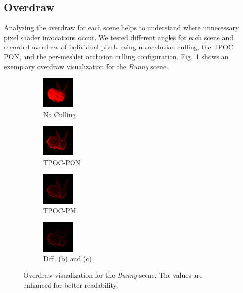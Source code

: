 \documentclass[conference]{IEEEtran}
\begin{document}
\subsection{Overdraw} \label{subsec-overdraw}

\noindent
Analyzing the overdraw for each scene helps to understand where unnecessary pixel shader 
invocations occur. We tested different angles for each scene and recorded overdraw of individual 
pixels using no occlusion culling, the \ac{TPOC-PON}, and the per-meshlet occlusion 
culling configuration. Fig.~\ref{fig:overdraw} shows an exemplary overdraw visualization for the 
\emph{Bunny} scene. \\

\begin{figure}
    \begin{subfigure}{60px}
        \includegraphics[width=60px]{images/overdraw-bunny2-nocull.png}
        \caption{No Culling}
        \parbox{\linewidth}{\centering\footnotesize }
    \end{subfigure}
    \begin{subfigure}{60px}
        \includegraphics[width=60px]{images/overdraw-bunny2-pooc.png}
        \caption{\ac{TPOC-PON}}
        \parbox{\linewidth}{\centering\footnotesize }
    \end{subfigure}
    \begin{subfigure}{60px}
        \includegraphics[width=60px]{images/overdraw-bunny2-pmoc.png}
        \caption{\ac{TPOC-PM}}
        \parbox{\linewidth}{\centering\footnotesize }
    \end{subfigure}
    \begin{subfigure}{60px}
        \includegraphics[width=60px]{images/overdraw-bunny2-diff.png}
        \caption{Diff. (b) and (c)}
        \parbox{\linewidth}{\centering\footnotesize }
    \end{subfigure}
    
    \caption{Overdraw visualization for the \emph{Bunny} scene. The values are enhanced for 
    better readability.}
    \label{fig:overdraw}
\end{figure}
\end{document}
